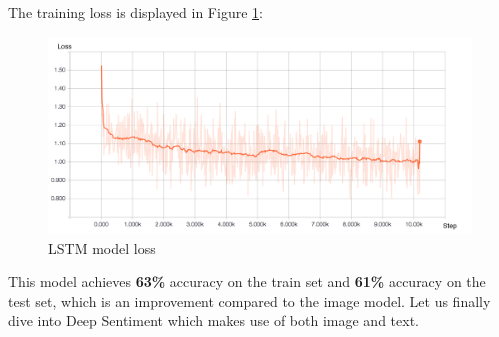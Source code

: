 The training loss is displayed in Figure \ref{text-loss}:

\begin{figure}[H]
    \centering
    \includegraphics[width=\textwidth]{Images/text_loss_cleaned.jpg}
    \caption{LSTM model loss}
    \label{text-loss}
\end{figure}

This model achieves \textbf{63\%} accuracy on the train set and \textbf{61\%} accuracy on the test set, which is an improvement compared to the image model. Let us finally dive into Deep Sentiment which makes use of both image and text.







